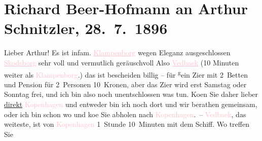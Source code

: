 

               \section[Richard Beer-Hofmann an Arthur Schnitzler, 28. 7. 1896]{ Richard Beer-Hofmann an Arthur Schnitzler, 28. 7. 1896}\nopagebreak{}\rehead{ }\normalsize\beginnumbering{} \toendnotes[C]{\smallbreak\pagebreak[2]} 
\pstart
           \noindent{}{\pb}Lieber Arthur! Es
               ist infam.\pend
           \pstart
           \textcolor{pink}{\uline{Klampenborg}}{}\ledrightnote{\textcolor{pink}{Klampenborg}} wegen Eleganz ausgeschlossen\pend
           \pstart
           \textcolor{pink}{\uline{Skodsborg}}{}\ledrightnote{\textcolor{pink}{Skodsborg}} sehr voll und vermutlich geräuschvoll\pend
           \pstart
           Also \textcolor{pink}{\uline{Vedbaek}}{}\ledrightnote{\textcolor{pink}{Vedbæk}} (10 Minuten weiter als \textcolor{pink}{Klampenborg}{}\ledrightnote{\textcolor{pink}{Klampenborg}}.)\pend
           \pstart
           das ist bescheiden billig – für \substVorne{}\textsuperscript{g}\substDazwischen{}e\substHinten{}in Zi{\geminationm}er mit 2 Betten und Pension für 2 Personen
               10 Kronen, aber das Zi{\geminationm}er wird erst {\pb}Samstag oder Sonntag frei, und ich bin also noch
               unentschlossen was tun. Ko{\geminationm}en Sie daher lieber \uline{direkt}{ }\textcolor{pink}{Kopenhagen}{}\ledrightnote{\textcolor{pink}{Kopenhagen}} und entweder bin ich noch dort und wir
               berathen gemeinsam, oder ich bin schon wo und ko{\geminationm}e Sie
               abholen nach \textcolor{pink}{Kopenhagen}{}\ledrightnote{\textcolor{pink}{Kopenhagen}}. –\pend
           \pstart
           {\pb}\textcolor{pink}{Vedbaek}{}\ledrightnote{\textcolor{pink}{Vedbæk}}, das weiteste, ist von \textcolor{pink}{Kopenhagen}{}\ledrightnote{\textcolor{pink}{Kopenhagen}} 1 Stunde 10 Minuten mit dem Schiff. Wo treffen Sie
